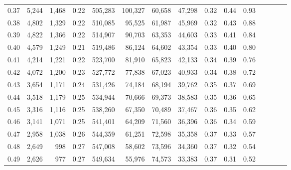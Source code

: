 \begin{tabular}{rrrcrrrrrrrrrrr}
0.37 &   5,244 &  1,468 &                                       0.22 &  505,283 &  100,327 &   60,658 &   47,298 &  0.32 &  0.44 &                         0.93 \\
0.38 &   4,802 &  1,329 &                                       0.22 &  510,085 &   95,525 &   61,987 &   45,969 &  0.32 &  0.43 &                         0.88 \\
0.39 &   4,822 &  1,366 &                                       0.22 &  514,907 &   90,703 &   63,353 &   44,603 &  0.33 &  0.41 &                         0.84 \\
0.40 &   4,579 &  1,249 &                                       0.21 &  519,486 &   86,124 &   64,602 &   43,354 &  0.33 &  0.40 &                         0.80 \\
0.41 &   4,214 &  1,221 &                                       0.22 &  523,700 &   81,910 &   65,823 &   42,133 &  0.34 &  0.39 &                         0.76 \\
0.42 &   4,072 &  1,200 &                                       0.23 &  527,772 &   77,838 &   67,023 &   40,933 &  0.34 &  0.38 &                         0.72 \\
0.43 &   3,654 &  1,171 &                                       0.24 &  531,426 &   74,184 &   68,194 &   39,762 &  0.35 &  0.37 &                         0.69 \\
0.44 &   3,518 &  1,179 &                                       0.25 &  534,944 &   70,666 &   69,373 &   38,583 &  0.35 &  0.36 &                         0.65 \\
0.45 &   3,316 &  1,116 &                                       0.25 &  538,260 &   67,350 &   70,489 &   37,467 &  0.36 &  0.35 &                         0.62 \\
0.46 &   3,141 &  1,071 &                                       0.25 &  541,401 &   64,209 &   71,560 &   36,396 &  0.36 &  0.34 &                         0.59 \\
0.47 &   2,958 &  1,038 &                                       0.26 &  544,359 &   61,251 &   72,598 &   35,358 &  0.37 &  0.33 &                         0.57 \\
0.48 &   2,649 &    998 &                                       0.27 &  547,008 &   58,602 &   73,596 &   34,360 &  0.37 &  0.32 &                         0.54 \\
0.49 &   2,626 &    977 &                                       0.27 &  549,634 &   55,976 &   74,573 &   33,383 &  0.37 &  0.31 &                         0.52 \\

\end{tabular}
